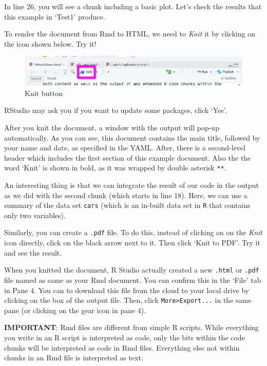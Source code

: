 \documentclass[
]{book}
\begin{document}
In line 26, you will see a chunk including a basic plot. Let's check the results that this example in `Test1' produce.

To render the document from Rmd to HTML, we need to \emph{Knit} it by clicking on the icon shown below. Try it!

\begin{figure}
\centering
\includegraphics{./images/lab4_rmd_knit.png}
\caption{Knit button}
\end{figure}

RStudio may ask you if you want to update some packages, click `Yes'.

After you knit the document, a window with the output will pop-up automatically. As you can see, this document contains the main title, followed by your name and date, as specified in the YAML. After, there is a second-level header which includes the first section of this example document. Also the the word `Knit' is shown in bold, as it was wrapped by double asterisk \texttt{**}.

An interesting thing is that we can integrate the result of our code in the output as we did with the second chunk (which starts in line 18). Here, we can use a summary of the data set \texttt{cars} (which is an in-built data set in \texttt{R} that contains only two variables).

Similarly, you can create a \texttt{.pdf} file. To do this, instead of clicking on on the \emph{Knit} icon directly, click on the black arrow next to it. Then click `Knit to PDF'. Try it and see the result.

When you knitted the document, R Studio actually created a new \texttt{.html} or \texttt{.pdf} file named as same as your Rmd document. You can confirm this in the `File' tab in Pane 4. You can to download this file from the cloud to your local drive by clicking on the box of the output file. Then, click \texttt{More\textgreater{}Export...} in the same pane (or clicking on the gear icon in pane 4).

\textbf{IMPORTANT}: Rmd files are different from simple R scripts. While everything you write in an R script is interpreted as code, only the bits within the code chunks will be interpreted as code in Rmd files. Everything else not within chunks in an Rmd file is interpreted as text.
\end{document}
